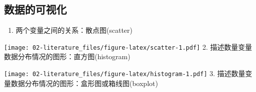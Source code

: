 \documentclass[
]{book}
\newenvironment{Shaded}{\begin{snugshade}}{\end{snugshade}}
\newcommand{\AttributeTok}[1]{\textcolor[rgb]{0.77,0.63,0.00}{#1}}
\newcommand{\DecValTok}[1]{\textcolor[rgb]{0.00,0.00,0.81}{#1}}
\newcommand{\FunctionTok}[1]{\textcolor[rgb]{0.00,0.00,0.00}{#1}}
\newcommand{\NormalTok}[1]{#1}
\newcommand{\SpecialCharTok}[1]{\textcolor[rgb]{0.00,0.00,0.00}{#1}}
\providecommand{\tightlist}{%
  \setlength{\itemsep}{0pt}\setlength{\parskip}{0pt}}
\begin{document}
\hypertarget{ux6570ux636eux7684ux53efux89c6ux5316}{%
\subsection{数据的可视化}\label{ux6570ux636eux7684ux53efux89c6ux5316}}

\begin{enumerate}
\def\labelenumi{\arabic{enumi}.}
\tightlist
\item
  两个变量之间的关系：散点图(scatter)
\end{enumerate}

\begin{Shaded}
\end{Shaded}

\texttt{[image: 02-literature\_files/figure-latex/scatter-1.pdf]}
2. 描述数量变量数据分布情况的图形：直方图(histogram)

\begin{Shaded}
\end{Shaded}

\texttt{[image: 02-literature\_files/figure-latex/histogram-1.pdf]}
3. 描述数量变量数据分布情况的图形：盒形图或箱线图(boxplot)

\begin{Shaded}
\end{Shaded}
\end{document}

